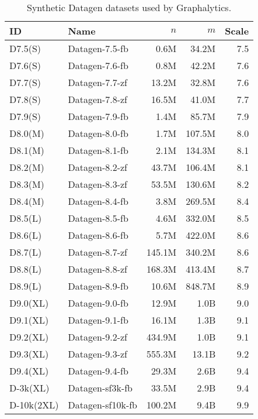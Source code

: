 \begin{table}[t!]
\caption{Synthetic Datagen datasets used by Graphalytics.}
\label{tab:datagen-datasets}
\centering
\begin{tabular}{|l|l|r|r|r|}
\hline
\textbf{ID} & \textbf{Name} & $n$ & $m$ & \textbf{Scale} \\
\hline \hline
D7.5(S) & Datagen-7.5-fb & 0.6M & 34.2M & 7.5 \\ \hline
D7.6(S) & Datagen-7.6-fb & 0.8M & 42.2M & 7.6 \\ \hline
D7.7(S) & Datagen-7.7-zf & 13.2M & 32.8M & 7.6 \\ \hline
D7.8(S) & Datagen-7.8-zf & 16.5M & 41.0M & 7.7 \\ \hline
D7.9(S) & Datagen-7.9-fb & 1.4M & 85.7M & 7.9 \\ \hline
D8.0(M) & Datagen-8.0-fb & 1.7M & 107.5M & 8.0 \\ \hline
D8.1(M) & Datagen-8.1-fb & 2.1M & 134.3M & 8.1 \\ \hline
D8.2(M) & Datagen-8.2-zf & 43.7M & 106.4M & 8.1 \\ \hline
D8.3(M) & Datagen-8.3-zf & 53.5M & 130.6M & 8.2 \\ \hline
D8.4(M) & Datagen-8.4-fb & 3.8M & 269.5M & 8.4 \\ \hline
D8.5(L) & Datagen-8.5-fb & 4.6M & 332.0M & 8.5 \\ \hline
D8.6(L) & Datagen-8.6-fb & 5.7M & 422.0M & 8.6 \\ \hline
D8.7(L) & Datagen-8.7-zf & 145.1M & 340.2M & 8.6 \\ \hline
D8.8(L) & Datagen-8.8-zf & 168.3M & 413.4M & 8.7 \\ \hline
D8.9(L) & Datagen-8.9-fb & 10.6M & 848.7M & 8.9 \\ \hline
D9.0(XL) & Datagen-9.0-fb & 12.9M & 1.0B & 9.0 \\ \hline
D9.1(XL) & Datagen-9.1-fb & 16.1M & 1.3B & 9.1 \\ \hline
D9.2(XL) & Datagen-9.2-zf & 434.9M & 1.0B & 9.1 \\ \hline
D9.3(XL) & Datagen-9.3-zf & 555.3M & 13.1B & 9.2 \\ \hline
D9.4(XL) & Datagen-9.4-fb & 29.3M & 2.6B & 9.4 \\ \hline
D-3k(XL) & Datagen-sf3k-fb & 33.5M & 2.9B & 9.4 \\ \hline
D-10k(2XL) & Datagen-sf10k-fb & 100.2M & 9.4B & 9.9 \\ \hline
\end{tabular}
\end{table}



